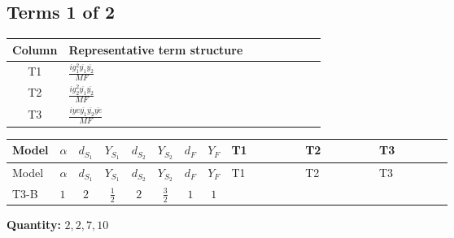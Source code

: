 \documentclass[8pt]{article}
\begin{document}
\begin{landscape}
\subsection*{Terms 1 of 2}
\begin{center}
\begin{tabular}{@{}c >{\raggedright\arraybackslash}p{0.82\linewidth}@{}}
\toprule
Column & Representative term structure \\
\midrule
T1 & \(\displaystyle \frac{i g_{1}^{2} \overline{y_{1}} \overline{y_{2}}}{MF}\) \\
\midrule
T2 & \(\displaystyle \frac{i g_{2}^{2} \overline{y_{1}} \overline{y_{2}}}{MF}\) \\
\midrule
T3 & \(\displaystyle \frac{i ye \overline{y_{1}} \overline{y_{2}} \overline{ye}}{MF}\) \\
\midrule
\bottomrule
\end{tabular}
\end{center}
\smallskip
\tiny
\begin{longtable}{@{}llcccccc >{\raggedright\arraybackslash}p{0.21\linewidth} >{\raggedright\arraybackslash}p{0.21\linewidth} >{\raggedright\arraybackslash}p{0.21\linewidth}@{}}
\toprule
Model & $\alpha$ & $d_{S_1}$ & $Y_{S_1}$ & $d_{S_2}$ & $Y_{S_2}$ & $d_F$ & $Y_F$ & T1 & T2 & T3 \\
\midrule
\endfirsthead
\toprule
Model & $\alpha$ & $d_{S_1}$ & $Y_{S_1}$ & $d_{S_2}$ & $Y_{S_2}$ & $d_F$ & $Y_F$ & T1 & T2 & T3 \\
\midrule
\endhead
T3-B & $1$ & $2$ & $\frac{1}{2}$ & $2$ & $\frac{3}{2}$ & $1$ & $1$ & \scriptsize\adjustbox{max width=\linewidth}{$\begin{gathered} \frac{3 i g_{1}^{2} \overline{y_{1}} \overline{y_{2}}}{2 MF}\end{gathered}$} & \scriptsize\adjustbox{max width=\linewidth}{$\begin{gathered} \frac{3 i g_{2}^{2} \overline{y_{1}} \overline{y_{2}}}{4 MF}\end{gathered}$} & \scriptsize\adjustbox{max width=\linewidth}{$\begin{gathered} - \frac{i ye \overline{y_{1}} \overline{y_{2}} \overline{ye}}{4 MF}\end{gathered}$} \\
\midrule
\bottomrule
\end{longtable}
\clearpage
\noindent\textbf{Quantity: }$\mathrm{2,2,7,10}$\par\smallskip

\end{landscape}
\end{document}
